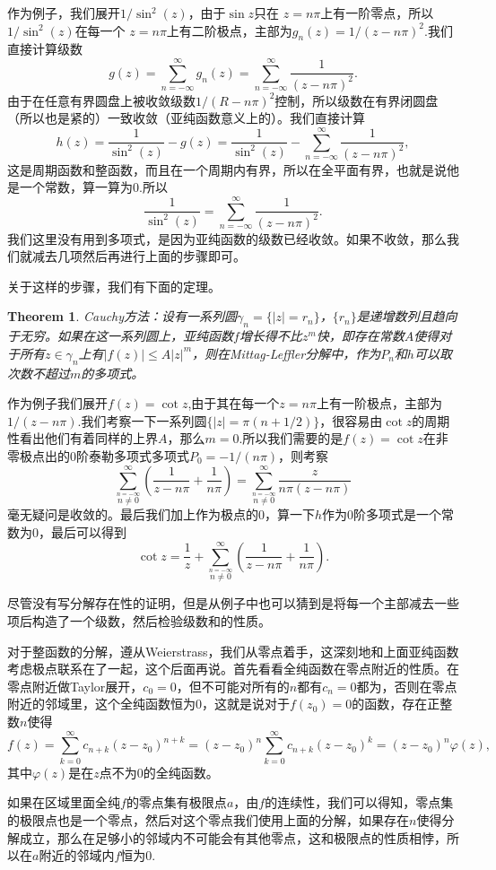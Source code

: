 \documentclass[10pt]{book}
\theoremstyle{plain}%
\newtheorem{theo}{Theorem}[chapter]%
\begin{document}
作为例子，我们展开$1/\sin^2(z)$，由于$\sin z$只在 $z=n\pi$上有一阶零点，所以$1/\sin^2(z)$在每一个 $z=n\pi$上有二阶极点，主部为$g_n(z)=1/(z-n\pi)^2$.我们直接计算级数
\[
g(z)=\sum_{n=-\infty}^\infty g_n(z)=\sum_{n=-\infty}^\infty \frac{1}{(z-n\pi)^2}.
\]
由于在任意有界圆盘上被收敛级数$1/(R-n\pi)^2$控制，所以级数在有界闭圆盘（所以也是紧的）一致收敛（亚纯函数意义上的）。我们直接计算
\[
h(z)=\frac{1}{\sin^2(z)}-g(z)=\frac{1}{\sin^2(z)}-\sum_{n=-\infty}^\infty \frac{1}{(z-n\pi)^2},
\]
这是周期函数和整函数，而且在一个周期内有界，所以在全平面有界，也就是说他是一个常数，算一算为0.所以
\[
\frac{1}{\sin^2(z)}=\sum_{n=-\infty}^\infty \frac{1}{(z-n\pi)^2}.
\]
我们这里没有用到多项式，是因为亚纯函数的级数已经收敛。如果不收敛，那么我们就减去几项然后再进行上面的步骤即可。

关于这样的步骤，我们有下面的定理。
\begin{theo}
Cauchy方法：设有一系列圆$\gamma_n=\{|z|=r_n\}$，$\{r_n\}$是递增数列且趋向于无穷。如果在这一系列圆上，亚纯函数$f$增长得不比$z^m$快，即存在常数$A$使得对于所有$z\in \gamma_n$上有$|f(z)|\leq A|z|^m$，则在Mittag-Leffler分解中，作为$P_n$和$h$可以取次数不超过$m$的多项式。
\end{theo}
作为例子我们展开$f(z)=\cot z$,由于其在每一个$z=n \pi$上有一阶极点，主部为$1/(z-n\pi)$.我们考察一下一系列圆$\{|z|=\pi(n+1/2)\}$，很容易由$\cot z$的周期性看出他们有着同样的上界$A$，那么$m=0$.所以我们需要的是$f(z)=\cot z$在非零极点出的0阶泰勒多项式多项式$P_0=-1/(n\pi)$，则考察
\[
\sum_{\stackrel{n=-\infty}{n\neq 0}}^\infty \left(\frac{1}{z-n\pi}+\frac{1}{n\pi}\right)=\sum_{\stackrel{n=-\infty}{n\neq 0}}^\infty \frac{z}{n\pi(z-n\pi)}
\]
毫无疑问是收敛的。最后我们加上作为极点的0，算一下$h$作为0阶多项式是一个常数为0，最后可以得到
\[
\cot z =\frac{1}{z}+\sum_{\stackrel{n=-\infty}{n\neq 0}}^\infty \left(\frac{1}{z-n\pi}+\frac{1}{n\pi}\right).
\]

尽管没有写分解存在性的证明，但是从例子中也可以猜到是将每一个主部减去一些项后构造了一个级数，然后检验级数和的性质。

对于整函数的分解，遵从Weierstrass，我们从零点着手，这深刻地和上面亚纯函数考虑极点联系在了一起，这个后面再说。首先看看全纯函数在零点附近的性质。在零点附近做Taylor展开，$c_0=0$，但不可能对所有的$n$都有$c_n=0$都为，否则在零点附近的邻域里，这个全纯函数恒为0，这就是说对于$f(z_0)=0$的函数，存在正整数$n$使得\[f(z)=\sum_{k=0}^\infty c_{n+k}(z-z_0)^{n+k}=(z-z_0)^n \sum_{k=0}^\infty c_{n+k}(z-z_0)^k=(z-z_0)^n \varphi(z),\]其中$\varphi(z)$是在$z$点不为0的全纯函数。

如果在区域里面全纯$f$的零点集有极限点$a$，由$f$的连续性，我们可以得知，零点集的极限点也是一个零点，然后对这个零点我们使用上面的分解，如果存在$n$使得分解成立，那么在足够小的邻域内不可能会有其他零点，这和极限点的性质相悖，所以在$a$附近的邻域内$f$恒为0.
\end{document}
